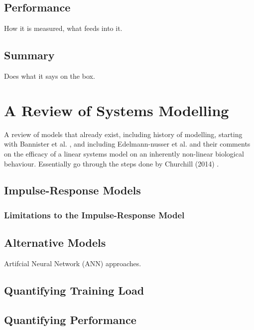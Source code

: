 \subsection{Performance}
How it is measured, what feeds into it.

\subsection{Summary}
Does what it says on the box.

\section{A Review of Systems Modelling}
A review of models that already exist, including history of modelling, starting with Bannister et al. \cite{Calvert1976}, and including Edelmann-nusser et al. \cite{Edelmannnusser2002} and their comments on the efficacy of a linear systems model on an inherently non-linear biological behaviour. Essentially go through the steps done by Churchill (2014) \cite{Churchill2014}.

\subsection{Impulse-Response Models}
\subsubsection{Limitations to the Impulse-Response Model}

\subsection{Alternative Models}
Artifcial Neural Network (ANN) approaches. 

\subsection{Quantifying Training Load}
\subsection{Quantifying Performance}